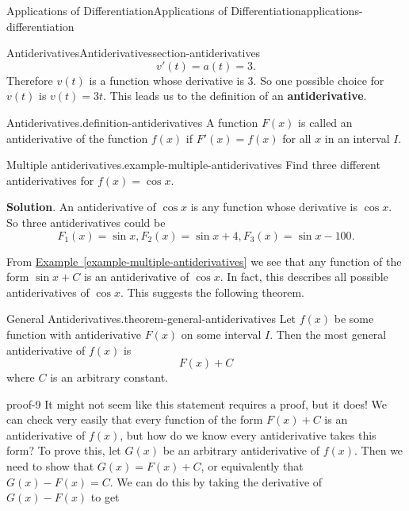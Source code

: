 \documentclass[oneside,10pt,]{book}
\newcommand{\terminology}[1]{\textbf{#1}}
\numberwithin{equation}{section}
\begin{document}
\begin{chapterptx}{Applications of Differentiation}{}{Applications of Differentiation}{}{}{applications-differentiation}
\begin{sectionptx}{Antiderivatives}{}{Antiderivatives}{}{}{section-antiderivatives}
\begin{equation*}
v'(t) = a(t) = 3.
\end{equation*}
Therefore \(v(t)\) is a function whose derivative is \(3\). So one possible choice for \(v(t)\) is \(v(t) = 3t\). This leads us to the definition of an \terminology{antiderivative}.%
\begin{definition}{Antiderivatives.}{definition-antiderivatives}%
\hypertarget{p-378}{}%
A function \(F(x)\) is called an antiderivative of the function \(f(x)\) if \(F'(x) = f(x)\) for all \(x\) in an interval \(I\).%
\end{definition}
\begin{example}{Multiple antiderivatives.}{example-multiple-antiderivatives}%
\hypertarget{p-379}{}%
Find three different antiderivatives for \(f(x) = \cos x\).%
\par\smallskip%
\noindent\textbf{Solution}.\hypertarget{solution-84}{}\quad%
\hypertarget{p-380}{}%
An antiderivative of \(\cos x\) is any function whose derivative is \(\cos x\). So three antiderivatives could be%
\begin{equation*}
F_{1}(x) = \sin x, F_{2}(x) = \sin x + 4, F_{3}(x) = \sin x - 100.
\end{equation*}
%
\end{example}
\hypertarget{p-381}{}%
From \hyperref[example-multiple-antiderivatives]{Example~\ref{example-multiple-antiderivatives}} we see that any function of the form \(\sin x +C\) is an antiderivative of \(\cos x\). In fact, this describes all possible antiderivatives of \(\cos x\). This suggests the following theorem.%
\begin{theorem}{General Antiderivatives.}{}{theorem-general-antiderivatives}%
\hypertarget{p-382}{}%
Let \(f(x)\) be some function with antiderivative \(F(x)\) on some interval \(I\). Then the most general antiderivative of \(f(x)\) is%
\begin{equation*}
F(x) + C
\end{equation*}
where \(C\) is an arbitrary constant.%
\end{theorem}
\begin{proofptx}{}{proof-9}
\hypertarget{p-383}{}%
It might not seem like this statement requires a proof, but it does! We can check very easily that every function of the form \(F(x)+C\) is an antiderivative of \(f(x)\), but how do we know every antiderivative takes this form? To prove this, let \(G(x)\) be an arbitrary antiderivative of \(f(x)\). Then we need to show that \(G(x) = F(x) + C\), or equivalently that \(G(x) - F(x) = C\). We can do this by taking the derivative of \(G(x) - F(x)\) to get%

\end{proofptx}
\end{sectionptx}
\end{chapterptx}
\end{document}
